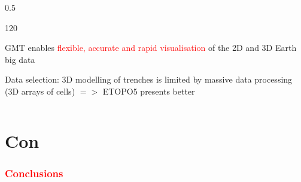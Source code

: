 \documentclass[pdflatex,compress,8pt,
	xcolor={dvipsnames,svgnames,x11names,table},
	hyperref={colorlinks = true,breaklinks = true, urlcolor = NavyBlue}]{beamer}
\begin{document}
\begin{frame}
\begin{minipage}[0.4\textheight]{\textwidth}
\begin{columns}[T]
\begin{column}{0.5\textwidth}
\begin{dinglist}{120}
     \item GMT enables \textcolor{red}{flexible, accurate and rapid visualisation} of the 2D and 3D Earth big data
     \item Data selection: 3D modelling of trenches is limited by massive data processing (3D arrays of cells) $=>$  ETOPO5 presents better
 \end{dinglist} 
\end{column}
\end{columns}
\end{minipage}
\end{frame}

\section{Con}

\begin{frame}\frametitle{\textcolor{red}{Conclusions}}


\end{frame}
\end{document}
